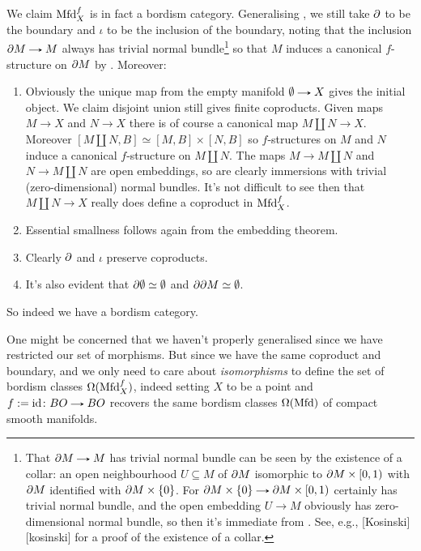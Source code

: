 \begin{definition}
  We claim $\mathrm{Mfd}^f_X$ is in fact a bordism category. Generalising
  , we still take $\partial$ to be the boundary and
  $\iota$ to be the inclusion of the boundary, noting that the
  inclusion $\d M \to M$ always has trivial normal
  bundle\footnote{That $\d M \to M$ has trivial normal bundle can be
    seen by the existence of a collar: an open neighbourhood $U
    \subseteq M$ of $\partial M$ isomorphic to $\partial M \times [0, 1)$ with $\partial
    M$ identified with $\partial M \times \{0\}$. For $\d M \times \{0\} \to
    \d M \times [0,1)$ certainly has trivial normal bundle, and the
    open embedding $U \to M$ obviously has zero-dimensional normal
    bundle, so then it's immediate from . See,
    e.g., [Kosinski][kosinski] for a proof of the existence of a
    collar.} so that $M$ induces a canonical $f$-structure on $\partial M$
  by . Moreover:
  \begin{enumerate}
  \item Obviously the unique map from the empty manifold $\e \to X$
    gives the initial object. We claim disjoint union still gives
    finite coproducts. Given maps $M \to X$ and $N \to X$ there is of
    course a canonical map $M \amalg N \to X$. Moreover $[M \amalg N,
    B] \simeq [M, B] \times [N, B]$ so $f$-structures on $M$ and $N$
    induce a canonical $f$-structure on $M \amalg N$. The maps $M \to
    M \amalg N$ and $N \to M \amalg N$ are open embeddings, so are
    clearly immersions with trivial (zero-dimensional) normal
    bundles. It's not difficult to see then that $M \amalg N \to X$
    really does define a coproduct in $\mathrm{Mfd}^f_X$.
  \item Essential smallness follows again from the embedding theorem.
  \item Clearly $\partial$ and $\iota$ preserve coproducts.
  \item It's also evident that $\partial\emptyset \simeq \emptyset$ and $\partial\partial M \simeq \emptyset$.
  \end{enumerate}
  So indeed we have a bordism category.
\end{definition}

\begin{remark}
  One might be concerned that we haven't properly generalised
   since we have restricted our set of
  morphisms. But since we have the same coproduct and boundary, and we
  only need to care about \emph{isomorphisms} to define the set of bordism
  classes $\Omega(\mathrm{Mfd}^f_X)$, indeed setting $X$ to be a point and $f
  \ce \id \c BO \to BO$ recovers the same bordism classes
  $\Omega(\mathrm{Mfd})$ of compact smooth manifolds.
\end{remark}

